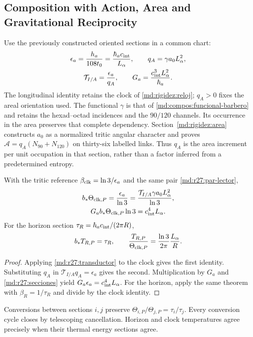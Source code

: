 \subsection{Composition with Action, Area and Gravitational Reciprocity}
\label{md:r27:composicion}
Use the previously constructed oriented sections in a common chart:
\begin{equation}
 \begin{gathered}
 \epsilon_a=\frac{h_a}{108t_0}=\frac{\hbar_a c_{\rm int}}{L_\alpha},
 \qquad q_A=\gamma a_0L_\alpha^2,\\
 \mathcal T_{I/A}=\frac{\epsilon_a}{q_A},\qquad
 G_a=\frac{c_{\rm int}^3L_\alpha^2}{\hbar_a}.
 \end{gathered}
 \label{md:r27:secciones}
\end{equation}
The longitudinal identity retains the clock of
\eqref{md:rigidez:reloj}; $q_A>0$ fixes the areal orientation used.
The functional $\gamma$ is that of \eqref{md:compos:funcional-barbero} and
retains the hexad--octad incidences and the $90/120$ channels. Its occurrence
in the area preserves that complete dependency.
Section~\ref{md:rigidez:area} constructs $a_0$ as a normalized tritic angular
character and proves $\mathcal A=q_A(N_{90}+N_{120})$ on thirty-six labelled
links. Thus $q_A$ is the area increment per unit occupation in that section,
rather than a factor inferred from a predetermined entropy.

\begin{corollary}
With the tritic reference $\beta_{\rm clk}=\ln3/\epsilon_a$ and the same pair
\eqref{md:r27:par-lector},
\begin{equation}
 \begin{gathered}
 b_*\Theta_{{\rm clk},P}
 =\frac{\epsilon_a}{\ln3}
 =\frac{\mathcal T_{I/A}\gamma a_0L_\alpha^2}{\ln3},\\
 G_a b_*\Theta_{{\rm clk},P}\ln3=c_{\rm int}^4L_\alpha.
 \end{gathered}
 \label{md:r27:area-gravedad}
\end{equation}
For the horizon section $\tau_R=\hbar_a c_{\rm int}/(2\pi R)$,
\begin{equation}
 b_*T_{R,P}=\tau_R,\qquad
 \frac{T_{R,P}}{\Theta_{{\rm clk},P}}
 =\frac{\ln3}{2\pi}\frac{L_\alpha}{R}.
 \label{md:r27:horizonte}
\end{equation}
\end{corollary}
\begin{proof}
Applying \eqref{md:r27:transductor} to the clock gives the first identity.
Substituting $q_A$ in $\mathcal T_{I/A}q_A=\epsilon_a$ gives the second.
Multiplication by $G_a$ and \eqref{md:r27:secciones} yield
$G_a\epsilon_a=c_{\rm int}^4L_\alpha$. For the horizon, apply the same
theorem with $\beta_R=1/\tau_R$ and divide by the clock identity.
\end{proof}
Conversions between sections $i,j$ preserve
$\Theta_{i,P}/\Theta_{j,P}=\tau_i/\tau_j$. Every conversion cycle closes
by telescoping cancellation. Horizon and clock temperatures agree precisely
when their thermal energy sections agree.

